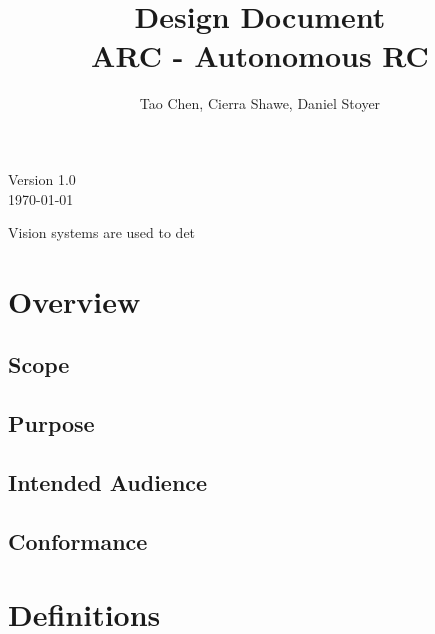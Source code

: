 \documentclass[compsoc,draftclsnofoot,onecolumn,10pt]{IEEEtran}
\date{}
\begin{document}
\begin{titlepage}
	\title{Design Document\\
	ARC - Autonomous RC}
	\author{Tao Chen, Cierra Shawe, Daniel Stoyer}
	\maketitle
	\begin{center}
	Version 1.0\\
	\vspace{1.9cm}
	\today
	\end{center}

	\thispagestyle{empty} %
	
\end{titlepage}

\tableofcontents

\newpage

Vision systems are used to det

\section{Overview}  
\subsection{Scope} 
\subsection{Purpose}
\subsection{Intended Audience} 
\subsection{Conformance}

\section{Definitions} 
\end{document}
